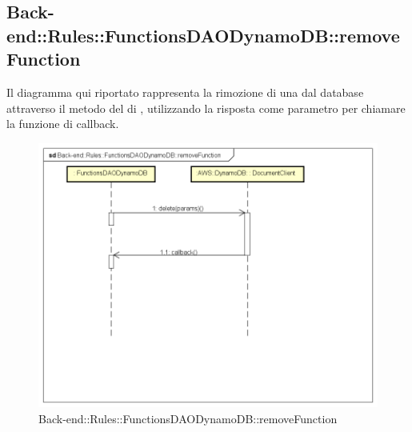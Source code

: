 \subsection{Back-end::Rules::FunctionsDAODynamoDB::removeFunction}
Il diagramma qui riportato rappresenta la rimozione di una  dal database attraverso il metodo  del  di , utilizzando la risposta come parametro per chiamare la funzione di callback. 
\begin{figure}[h] \centering \includegraphics[width=\textwidth,height=\textheight,keepaspectratio]{images/diagrams/back-end/Ufficial_Backend/Back-endRulesFunctionsDAODynamoDBremoveFunction.png} 	\caption{Back-end::Rules::FunctionsDAODynamoDB::removeFunction}
\end{figure}
\newpage

